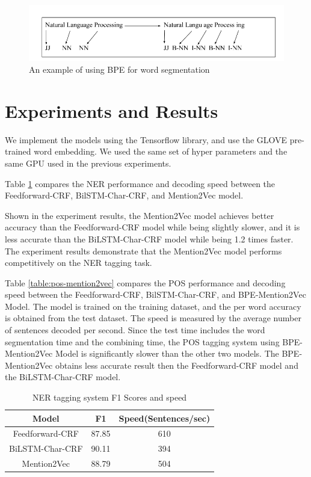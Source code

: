 \documentclass{sfuthesis}
\begin{document}
\begin{figure}
  \centering
  \includegraphics[scale=0.6]{bpe.png}
 \caption{An example of using BPE for word segmentation}
  \label{fig:bpe}
\end{figure}

\section{Experiments and Results}

We implement the models using the Tensorflow library, and use the GLOVE pre-trained word embedding. We used the same set of hyper parameters and the same GPU used in the previous experiments. 

Table \ref{table:ner-mention2vec} compares the NER performance and decoding speed between the Feedforward-CRF, BilSTM-Char-CRF, and Mention2Vec model.

Shown in the experiment results, the Mention2Vec model achieves better accuracy than the Feedforward-CRF model while being slightly slower, and it is less accurate than the BiLSTM-Char-CRF model while being 1.2 times faster. The experiment results demonstrate that the Mention2Vec model performs competitively on the NER tagging task.

Table \ref{table:pos-mention2vec} compares the POS performance and decoding speed between the Feedforward-CRF, BilSTM-Char-CRF, and BPE-Mention2Vec Model. The model is trained on the training dataset, and the per word accuracy is obtained from the test dataset. The speed is measured by the average number of sentences decoded per second. Since the test time includes the word segmentation time and the combining time, the POS tagging system using BPE-Mention2Vec Model is significantly slower than the other two models. The BPE-Mention2Vec obtains less accurate result then the Feedforward-CRF model and the BiLSTM-Char-CRF model. 

\begin{table}[]
\centering
\caption{NER tagging system F1 Scores and speed }
\label{table:ner-mention2vec}
\begin{tabular}{|c|c|c|}
\hline
Model            & F1     & Speed(Sentences/sec)        \\ \hline
Feedforward-CRF  & 87.85  & 610                     \\ \hline
BiLSTM-Char-CRF & 90.11  & 394                     \\ \hline
Mention2Vec      & 88.79  & 504                     \\ \hline
\end{tabular}
\end{table}
\end{document}

